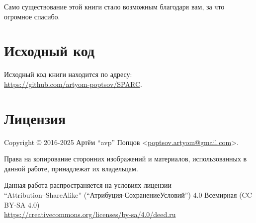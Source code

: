 \documentclass[../sparc.tex]{subfiles}
\begin{document}
Само существование этой книги стало возможным благодаря вам, за что огромное
спасибо.

\section*{Исходный код}

Исходный код книги находится по адресу: \\
\url{https://github.com/artyom-poptsov/SPARC}.

\section*{Лицензия}

Copyright © 2016-2025 Артём ``avp'' Попцов <\href{mailto:poptsov.artyom@gmail.com}{poptsov.artyom@gmail.com}>.

Права на копирование сторонних изображений и материалов, использованных в данной
работе, принадлежат их владельцам.

Данная работа распространяется на условиях лицензии
\\ ``Attribution--ShareAlike'' (``Атрибуция-СохранениеУсловий'') 4.0 Всемирная
(CC BY-SA 4.0) \\ \url{https://creativecommons.org/licenses/by-sa/4.0/deed.ru}
\end{document}
